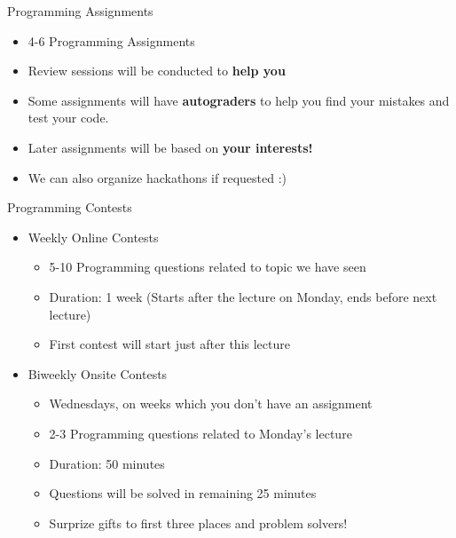 		\begin{frame}{Programming Assignments}
			\begin{itemize}
				\LARGE
				\item 4-6 Programming Assignments
				\pause
				\item Review sessions will be conducted to \textbf{help you}
				\pause
				\item Some assignments will have \textbf{autograders} to help you find your mistakes and test your code.
				\pause
				\item Later assignments will be based on \textbf{your interests!}
				\pause
				\item We can also organize hackathons if requested :)
			\end{itemize}
			\LARGE
			
		\end{frame}

		\begin{frame}{Programming Contests}
			\begin{itemize}
				\LARGE
				\item Weekly Online Contests
					\pause
					\begin{itemize}
						\Large
						\item 5-10 Programming questions related to topic we have seen
						\pause
						\item Duration: 1 week (Starts after the lecture on Monday, ends before next lecture)
						\pause
						\item First contest will start just after this lecture
					\end{itemize}
				\pause
				\item Biweekly Onsite Contests
					\begin{itemize}
						\Large
						\item Wednesdays, on weeks which you don't have an assignment
						\pause
						\item 2-3 Programming questions related to Monday's lecture
						\pause
						\item Duration: 50 minutes
						\pause
						\item Questions will be solved in remaining 25 minutes
						\pause
						\item Surprize gifts to first three places and problem solvers!
					\end{itemize}
			\end{itemize}
		\end{frame}

